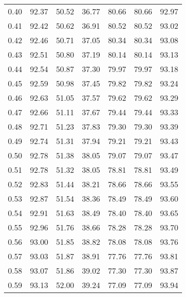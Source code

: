\begin{tabular}{|c|c|c|c|c|c|c|}
      0.40 &     92.37 &     50.52 &      36.77 &   80.66 &      80.66 &         92.97 \\
      0.41 &     92.42 &     50.62 &      36.91 &   80.52 &      80.52 &         93.02 \\
      0.42 &     92.46 &     50.71 &      37.05 &   80.34 &      80.34 &         93.08 \\
      0.43 &     92.51 &     50.80 &      37.19 &   80.14 &      80.14 &         93.13 \\
      0.44 &     92.54 &     50.87 &      37.30 &   79.97 &      79.97 &         93.18 \\
      0.45 &     92.59 &     50.98 &      37.45 &   79.82 &      79.82 &         93.24 \\
      0.46 &     92.63 &     51.05 &      37.57 &   79.62 &      79.62 &         93.29 \\
      0.47 &     92.66 &     51.11 &      37.67 &   79.44 &      79.44 &         93.33 \\
      0.48 &     92.71 &     51.23 &      37.83 &   79.30 &      79.30 &         93.39 \\
      0.49 &     92.74 &     51.31 &      37.94 &   79.21 &      79.21 &         93.43 \\
      0.50 &     92.78 &     51.38 &      38.05 &   79.07 &      79.07 &         93.47 \\
      0.51 &     92.78 &     51.32 &      38.05 &   78.81 &      78.81 &         93.49 \\
      0.52 &     92.83 &     51.44 &      38.21 &   78.66 &      78.66 &         93.55 \\
      0.53 &     92.87 &     51.54 &      38.36 &   78.49 &      78.49 &         93.60 \\
      0.54 &     92.91 &     51.63 &      38.49 &   78.40 &      78.40 &         93.65 \\
      0.55 &     92.96 &     51.76 &      38.66 &   78.28 &      78.28 &         93.70 \\
      0.56 &     93.00 &     51.85 &      38.82 &   78.08 &      78.08 &         93.76 \\
      0.57 &     93.03 &     51.87 &      38.91 &   77.76 &      77.76 &         93.81 \\
      0.58 &     93.07 &     51.86 &      39.02 &   77.30 &      77.30 &         93.87 \\
      0.59 &     93.13 &     52.00 &      39.24 &   77.09 &      77.09 &         93.94 \\

\end{tabular}
